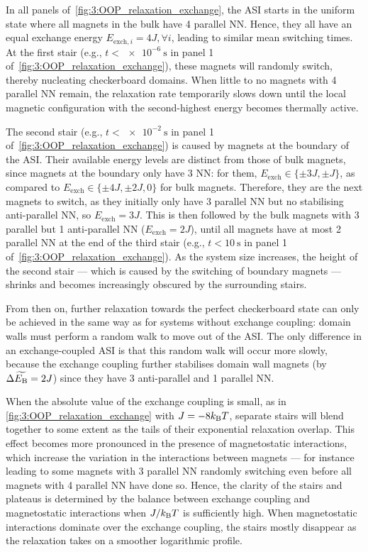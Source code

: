 In all panels of~\cref{fig:3:OOP_relaxation_exchange}, the ASI starts in the uniform state where all magnets in the bulk have 4 parallel NN.
Hence, they all have an equal exchange energy $E_{\mathrm{exch},i} = 4J, \forall i$, leading to similar mean switching times.
At the first stair (e.g., $t < \SI{e-6}{\second}$ in panel 1 of~\cref{fig:3:OOP_relaxation_exchange}), these magnets will randomly switch, thereby nucleating checkerboard domains.
When little to no magnets with 4 parallel NN remain, the relaxation rate temporarily slows down until the local magnetic configuration with the second-highest energy becomes thermally active. \par
The second stair (e.g., $t < \SI{e-2}{\second}$ in panel 1 of~\cref{fig:3:OOP_relaxation_exchange}) is caused by magnets at the boundary of the ASI.
Their available energy levels are distinct from those of bulk magnets, since magnets at the boundary only have 3 NN: for them, $E_\mathrm{exch} \in \{\pm 3J, \pm J\}$, as compared to $E_\mathrm{exch} \in \{\pm 4J, \pm 2J, 0\}$ for bulk magnets.
Therefore, they are the next magnets to switch, as they initially only have 3 parallel NN but no stabilising anti-parallel NN, so $E_\mathrm{exch} = 3J$.
This is then followed by the bulk magnets with 3 parallel but 1 anti-parallel NN ($E_\mathrm{exch} = 2J$), until all magnets have at most 2 parallel NN at the end of the third stair (e.g., $t < \SI{10}{\second}$ in panel 1 of~\cref{fig:3:OOP_relaxation_exchange}).
As the system size increases, the height of the second stair --- which is caused by the switching of boundary magnets --- shrinks and becomes increasingly obscured by the surrounding stairs. \par
From then on, further relaxation towards the perfect checkerboard state can only be achieved in the same way as for systems without exchange coupling: domain walls must perform a random walk to move out of the ASI.
The only difference in an exchange-coupled ASI is that this random walk will occur more slowly, because the exchange coupling further stabilises domain wall magnets (by $\Delta \widetilde{E_\mathrm{B}} = 2J$) since they have 3 anti-parallel and 1 parallel NN. \par
When the absolute value of the exchange coupling is small, as in \cref{fig:3:OOP_relaxation_exchange} with $J=-8\kBT$, separate stairs will blend together to some extent as the tails of their exponential relaxation overlap.
This effect becomes more pronounced in the presence of magnetostatic interactions, which increase the variation in the interactions between magnets --- for instance leading to some magnets with 3 parallel NN randomly switching even before all magnets with 4 parallel NN have done so.
Hence, the clarity of the stairs and plateaus is determined by the balance between exchange coupling and magnetostatic interactions when $J/\kBT$ is sufficiently high.
When magnetostatic interactions dominate over the exchange coupling, the stairs mostly disappear as the relaxation takes on a smoother logarithmic profile.

